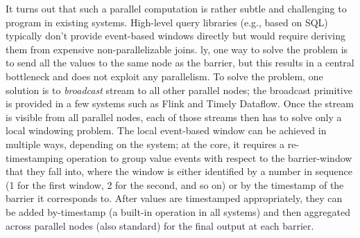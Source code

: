 It turns out that such a parallel computation is rather subtle and challenging to program in existing systems. High-level query libraries (e.g., based on SQL) typically don't provide event-based windows directly but would require deriving them from expensive non-parallelizable joins.
\Naive{}ly, one way to solve the problem is to send all the values to the same node as the barrier, but this results in a central bottleneck and does not exploit any parallelism.
To solve the problem, one solution is to \emph{broadcast} stream to all other parallel nodes; the broadcast primitive is provided in a few systems such as Flink and Timely Dataflow.
Once the stream is visible from all parallel nodes, each of those streams then has to solve only a local windowing problem.
The local event-based window can be achieved in multiple ways, depending on the system; at the core, it requires a re-timestamping operation to
group value events with respect to the barrier-window that they fall into,
where the window is either identified by a number in sequence (1 for the first window, 2 for the second, and so on) or by the timestamp of the barrier it corresponds to.
After values are timestamped appropriately, they can be added by-timestamp (a built-in operation in all systems) and then aggregated across parallel nodes (also standard) for the final output at each barrier.

